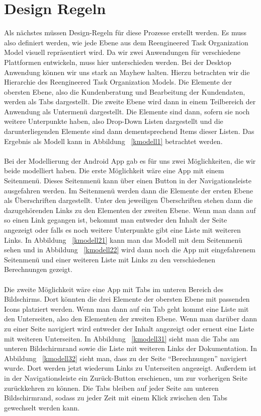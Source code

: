 \section{Design Regeln}

Als nächstes müssen Design-Regeln für diese Prozesse erstellt werden.  Es muss also definiert werden, wie jede Ebene aus dem Reengineered Task Organization Model visuell repräsentiert wird. Da wir zwei Anwendungen für verschiedene Plattformen entwickeln, muss hier unterschieden werden. Bei der Desktop Anwendung können wir uns stark an Mayhew halten. Hierzu betrachten wir die Hierarchie des Reengineered Task Organization Models. Die Elemente der obersten Ebene, also die Kundenberatung und Bearbeitung der Kundendaten, werden als Tabs dargestellt. Die zweite Ebene wird dann in einem Teilbereich der Anwendung als Untermenü dargestellt. Die Elemente sind dann, sofern sie noch weitere Unterpunkte haben, also Drop-Down Listen dargestellt und die darunterliegenden Elemente sind dann dementsprechend Items dieser Listen. Das Ergebnis als Modell kann in Abbildung ~\ref{kmodell1} betrachtet werden.
\\ \\
Bei der Modellierung der Android App gab es für uns zwei Möglichkeiten, die wir beide modelliert haben. Die erste Möglichkeit wäre eine App mit einem Seitenmenü. Dieses Seitenmenü kann über einen Button in der Navigationsleiste ausgefahren werden. Im Seitenmenü werden dann die Elemente der ersten Ebene als Überschriften dargestellt. Unter den jeweiligen Überschriften stehen dann die dazugehörenden Links zu den Elementen der zweiten Ebene. Wenn man dann auf so einen Link gegangen ist, bekommt man entweder den Inhalt der Seite angezeigt oder falls es noch weitere Unterpunkte gibt eine Liste mit weiteren Links. In Abbildung ~\ref{kmodell21} kann man das Modell mit dem Seitenmenü sehen und in Abbildung ~\ref{kmodell22} wird dann noch die App mit eingefahrenem Seitenmenü und einer weiteren Liste mit Links zu den verschiedenen Berechnungen gezeigt.
\\ \\
Die zweite Möglichkeit wäre eine App mit Tabs im unteren Bereich des Bildschirms. Dort könnten die drei Elemente der obersten Ebene mit passenden Icons platziert werden. Wenn man dann auf ein Tab geht kommt eine Liste mit den Unterseiten, also den Elementen der zweiten Ebene. Wenn man darüber dann zu einer Seite navigiert wird entweder der Inhalt angezeigt oder erneut eine Liste mit weiteren Unterseiten. In Abbildung ~\ref{kmodell31} sieht man die Tabs am unteren Bildschirmrand sowie die Liste mit weiteren Links der Dokumentation. In Abbildung ~\ref{kmodell32} sieht man, dass zu der Seite ``Berechnungen'' navigiert wurde. Dort werden jetzt wiederum Links zu Unterseiten angezeigt. Außerdem ist in der Navigationsleiste ein Zurück-Button erschienen, um zur vorherigen Seite zurückkehren zu können. Die Tabs bleiben auf jeder Seite am unteren Bildschirmrand, sodass zu jeder Zeit mit einem Klick zwischen den Tabs gewechselt werden kann.

